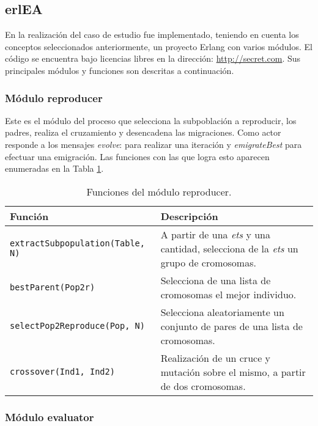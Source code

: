 \documentclass[runningheads]{llncs}
\begin{document}
\subsection{erlEA}

En la realización del caso de estudio fue implementado, teniendo en cuenta los conceptos seleccionados anteriormente, un proyecto Erlang con varios módulos. El código se encuentra bajo licencias libres en la dirección: \url{http://secret.com}. Sus principales módulos y funciones son descritas a continuación.


\subsubsection{Módulo reproducer}

Este es el módulo del proceso que selecciona la subpoblación a reproducir, los padres, realiza el cruzamiento y desencadena las migraciones. Como actor responde a los mensajes {\em evolve}: para realizar una iteración y {\em emigrateBest} para efectuar una emigración. Las funciones con las que logra esto aparecen enumeradas en la Tabla \ref{tb:reproducer}.

\begin{table}
  \centering
\begin{tabular}{|p{5cm}|p{7cm}|}
  \hline
   \textbf{Función} &  \textbf{Descripción} \\
  \hline
  {\tt extractSubpopulation(Table, N) } & A partir de una {\em ets} y una cantidad, selecciona de la {\em ets} un grupo de cromosomas. \\
  \hline
  {\tt bestParent(Pop2r)} & Selecciona de una lista de cromosomas el mejor individuo. \\
  \hline
 {\tt selectPop2Reproduce(Pop, N)} & Selecciona aleatoriamente un conjunto de pares de una lista de cromosomas. \\
  \hline
  {\tt crossover(Ind1, Ind2)} & Realización de un cruce y mutación sobre el mismo, a partir de dos cromosomas. \\
  \hline
\end{tabular}
  \caption{Funciones del módulo reproducer.}\label{tb:reproducer}
\end{table}


\subsubsection{Módulo evaluator}
\end{document}
